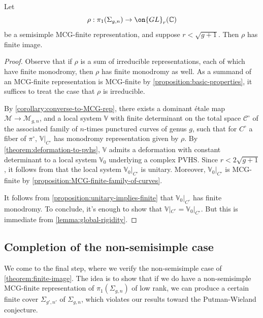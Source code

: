 \begin{theorem}
\notready
	\label{theorem:finite-image-semisimple}
	Let $$\rho: \pi_1(\Sigma_{g,n})\to \on{GL}_r(\mathbb{C})$$ be a semisimple MCG-finite representation, and suppose $r<\sqrt{g+1}$. Then $\rho$ has finite image.
\end{theorem}
\begin{proof}
	Observe that if $\rho$ is a sum of irreducible representations, each of
	which have finite monodromy, then $\rho$ has finite monodromy as well.
	As a summand of an MCG-finite representation is MCG-finite by
	\autoref{proposition:basic-properties}, it suffices to treat the case that $\rho$ is irreducible.

	By \autoref{corollary:converse-to-MCG-rep}, there exists a dominant
	\'etale map $\mathscr{M}\to \mathscr{M}_{g,n}$, and a local system
	$\mathbb{V}$ with finite determinant on the total space $\mathscr{C}^\circ$ of the associated
	family of $n$-times punctured curves of genus $g$, such that for
	$C^\circ$ a fiber of $\pi^\circ$, $\mathbb{V}|_{{C}^\circ}$ has monodromy representation given by $\rho$.
		By \autoref{theorem:deformation-to-pvhs}, $\mathbb V$ admits a deformation with constant determinant to a
	local system $\mathbb V_0$ underlying a complex PVHS.
	Since $r < 2\sqrt{g+1}$, it follows from \cite[Theorem
	1.2.12]{LL:geometric-local-systems} that
	the local system $\mathbb V_0|_{{C}^\circ}$ is unitary. Moreover, $\mathbb V_0|_{{C}^\circ}$ is MCG-finite by \autoref{proposition:MCG-finite-family-of-curves}.

	It follows from \autoref{proposition:unitary-implies-finite}
	that $\mathbb V_0|_{{C}^\circ}$ has finite monodromy.
	To conclude, it's enough to show that $\mathbb V|_{{C}^\circ} =
	\mathbb V_0|_{{C}^\circ}$.
	But this is immediate from \autoref{lemma:global-rigidity}.
\end{proof}

\subsection{Completion of the non-semisimple case}
\label{subsection:non-semisimple}
We come to the final step, where we verify the non-semisimple case of \autoref{theorem:finite-image}.
The idea is to show that if we do have a non-semisimple MCG-finite representation of $\pi_1(\Sigma_{g,n})$ of low rank, we
can produce a certain
 finite cover $\Sigma_{g',n'}$ of $\Sigma_{g,n}$, which violates
our results toward the Putman-Wieland conjecture.

